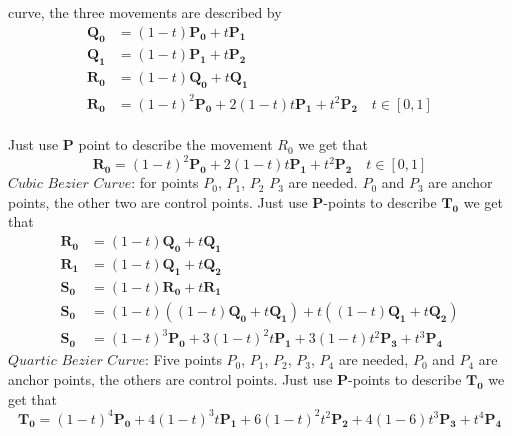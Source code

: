 \documentclass{article}
\begin{document}
    curve, the three movements are described by\\
    \begin{equation}
    \begin{aligned} 
        \mathbf{Q_0} &= (1-t) \mathbf{P_0} + t\mathbf{P_1} \\
        \mathbf{Q_1} &= (1-t) \mathbf{P_1} + t\mathbf{P_2} \\
        \mathbf{R_0} &= (1-t) \mathbf{Q_0} + t\mathbf{Q_1} \\ 
        \mathbf{R_0} &= (1-t)^2 \mathbf{P_0} + 2(1-t)t \mathbf{P_1}  + t^2 \mathbf{P_2} \quad t \in [0, 1] \nonumber
    \end{aligned} 
    \end{equation} \\

    Just use $\mathbf{P}$ point to describe the movement $R_0$ we get that \\
    \[ 
        \mathbf{R_0} = (1-t)^2 \mathbf{P_0} + 2(1-t)t \mathbf{P_1}  + t^2 \mathbf{P_2} \quad t \in [0, 1]
    \]
    $\textit{Cubic Bezier Curve}$: for points $P_0$, $P_1$, $P_2$ $P_3$ are needed. $P_0$ and $P_3$ are anchor points, the other two are control points.
    Just use $\mathbf{P}$-points to describe $\mathbf{T_0}$ we get that
    \begin{equation}
    \begin{aligned} 
        \mathbf{R_0} &= (1-t) \mathbf{Q_0} + t\mathbf{Q_1} \\
        \mathbf{R_1} &= (1-t) \mathbf{Q_1} + t\mathbf{Q_2} \\
        \mathbf{S_0} &= (1-t) \mathbf{R_0} + t\mathbf{R_1} \\ 
        \mathbf{S_0} &= (1-t) ((1-t) \mathbf{Q_0} + t\mathbf{Q_1}) + t ((1-t) \mathbf{Q_1} + t\mathbf{Q_2}) \\ 
        \mathbf{S_0} &= (1-t)^3 \mathbf{P_0} + 3(1-t)^2 t\mathbf{P_1} + 3(1-t) t^{2}\mathbf{P_3} + t^{3} \mathbf{P_4} \nonumber
    \end{aligned} 
    \end{equation}
    $\textit{Quartic Bezier Curve}$: Five points $P_0$, $P_1$, $P_2$, $P_3$, $P_4$ are needed, $P_0$ and $P_4$ are anchor points, the others are control points. 
    Just use $\mathbf{P}$-points to describe $\mathbf{T_0}$ we get that
    \[ 
        \mathbf{T_0} = (1-t)^4 \mathbf{P_0} + 4(1-t)^3 t\mathbf{P_1} + 6(1-t)^2 t^{2}\mathbf{P_2} + 4(1-6) t^3 \mathbf{P_3} + t^4 \mathbf{P_4} 
    \]
\end{document}

